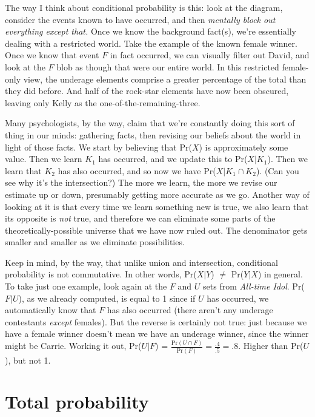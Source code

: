 The way I think about conditional probability is this: look at the diagram,
consider the events known to have occurred, and then \textit{mentally block
out everything except that.} Once we know the background fact(s), we're
essentially dealing with a restricted world. Take the example of the known
female winner. Once we know that event $F$ in fact occurred, we can
visually filter out David, and look at the $F$ blob as though that were our
entire world. In this restricted female-only view, the underage elements
comprise a greater percentage of the total than they did before. And half
of the rock-star elements have now been obscured, leaving only Kelly as the
one-of-the-remaining-three.

Many psychologists, by the way, claim that we're constantly doing this sort
of thing in our minds: gathering facts, then revising our beliefs about the
world in light of those facts. We start by believing that Pr($X$) is
approximately some value. Then we learn $K_1$ has occurred, and we update
this to Pr($X|K_1$). Then we learn that $K_2$ has also occurred, and so now
we have Pr($X|K_1 \cap K_2$). (Can you see why it's the intersection?) The
more we learn, the more we revise our estimate up or down, presumably
getting more accurate as we go. Another way of looking at it is that every
time we learn something new is true, we also learn that its opposite is
\textit{not} true, and therefore we can eliminate some parts of the
theoretically-possible universe that we have now ruled out. The denominator
gets smaller and smaller as we eliminate possibilities.

Keep in mind, by the way, that unlike union and intersection, conditional
probability is not commutative. In other words, Pr($X|Y$) $\neq$ Pr($Y|X$)
in general. To take just one example, look again at the $F$ and $U$ sets
from \textit{All-time Idol}. Pr($F|U$), as we already computed, is equal to
1 since if $U$ has occurred, we automatically know that $F$ has also
occurred (there aren't any underage contestants \textit{except} females).
But the reverse is certainly not true: just because we have a female
winner doesn't mean we have an underage winner, since the winner might be
Carrie. Working it out, Pr($U|F$) = $\frac{\text{Pr}(U \cap
F)}{\text{Pr}(F)} = \frac{.4}{.5} = .8$. Higher than Pr($U$), but not 1.

\section{Total probability}
\label{totalprob}

